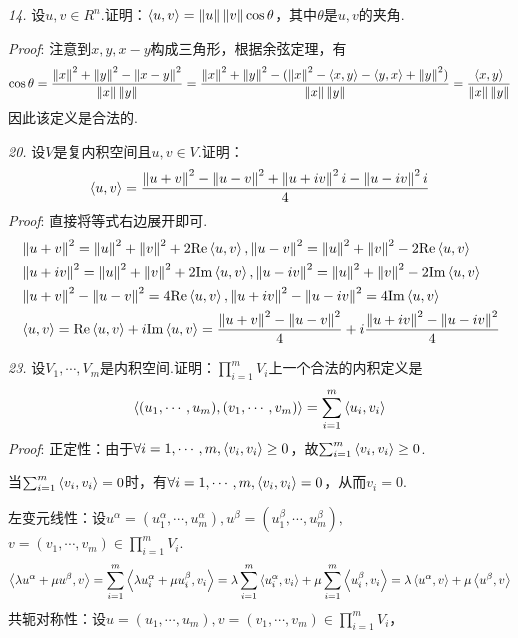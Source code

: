 \hspace*{\fill}

\textit{14.}
设\(u,v \in R^n\).证明：\(\ip{u}{v}=\norm{u}\norm{v}\cos \theta\)，其中\(\theta\)是\(u,v\)的夹角.

\textit{Proof}:
注意到\(x,y,x-y\)构成三角形，根据余弦定理，有
    \begin{align*}
        \cos \theta =\dfrac{\norm{x}^2+\norm{y}^2-\norm{x-y}^2}{\norm{x}\norm{y}}
        =\dfrac{\norm{x}^2+\norm{y}^2-(\norm{x}^2-\ip{x}{y}-\ip{y}{x}+\norm{y}^2)}{\norm{x}\norm{y}}
        =\dfrac{\ip{x}{y}}{\norm{x}\norm{y}}
    \end{align*}
因此该定义是合法的.

\newpage

\textit{20.}
设\(V\)是复内积空间且\(u,v \in V\).证明：
    \begin{align*}
        \ip{u}{v}=\dfrac{\norm{u+v}^2-\norm{u-v}^2+\norm{u+iv}^2i-\norm{u-iv}^2i}{4}
    \end{align*}
\textit{Proof}:
直接将等式右边展开即可.
    \begin{align*}
        &\norm{u+v}^2=\norm{u}^2+\norm{v}^2+2\mathrm{Re}\ip{u}{v},
        \norm{u-v}^2=\norm{u}^2+\norm{v}^2-2\mathrm{Re}\ip{u}{v} \\
        &\norm{u+iv}^2=\norm{u}^2+\norm{v}^2+2\mathrm{Im}\ip{u}{v},
        \norm{u-iv}^2=\norm{u}^2+\norm{v}^2-2\mathrm{Im}\ip{u}{v} \\
        &\norm{u+v}^2-\norm{u-v}^2=4\mathrm{Re}\ip{u}{v},
        \norm{u+iv}^2-\norm{u-iv}^2=4\mathrm{Im}\ip{u}{v} \\
        &\ip{u}{v}=\mathrm{Re}\ip{u}{v}+i\mathrm{Im}\ip{u}{v}
        =\dfrac{\norm{u+v}^2-\norm{u-v}^2}{4}+i\dfrac{\norm{u+iv}^2-\norm{u-iv}^2}{4}
    \end{align*}

\hspace*{\fill}

\textit{23.}
设\(V_1,\cdots,V_m\)是内积空间.证明：\(\prod_{i=1}^m V_i\)上一个合法的内积定义是
    \begin{align*}
        \ip{(u_1,\cdots,u_m)}{(v_1,\cdots,v_m)}=\sum_{i=1}^m \ip{u_i}{v_i}
    \end{align*}
\textit{Proof}:
正定性：由于\(\forall i=1,\cdots,m,\ip{v_i}{v_i} \geq 0\)，故\(\sum_{i=1}^m \ip{v_i}{v_i} \geq 0\).

当\(\sum_{i=1}^m \ip{v_i}{v_i}=0\)时，有\(\forall i=1,\cdots,m,\ip{v_i}{v_i}=0\)，从而\(v_i=0\).

左变元线性：设\(u^\alpha=(u_1^\alpha,\cdots,u_m^\alpha),u^\beta=(u_1^\beta,\cdots,u_m^\beta),\)
\(v=(v_1,\cdots,v_m) \in \prod_{i=1}^m V_i\).
    \begin{align*}
        \ip{\lambda u^\alpha+\mu u^\beta}{v}=\sum_{i=1}^m \ip{\lambda u_i^\alpha+\mu u_i^\beta}{v_i}
        =\lambda \sum_{i=1}^m \ip{u_i^\alpha}{v_i}+\mu \sum_{i=1}^m \ip{u_i^\beta}{v_i}
        =\lambda \ip{u^\alpha}{v}+\mu \ip{u^\beta}{v} 
    \end{align*}
共轭对称性：设\(u=(u_1,\cdots,u_m),v=(v_1,\cdots,v_m) \in \prod_{i=1}^m V_i\)，

